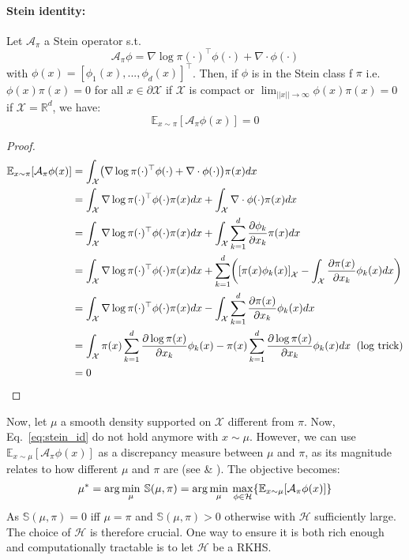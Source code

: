 \documentclass[runningheads,a4paper]{llncs}
\newcommand{\R}{\mathbb{R}}
\newcommand{\E}{\mathbb{E}}
\newcommand{\X}{\mathcal{X}}
\newcommand{\A}{\mathcal{A}}
\newcommand{\Hf}{\mathcal{H}}
\newcommand{\diff}[2]{\frac{\partial #1}{\partial #2}}
\DeclarePairedDelimiter{\pare}{(}{)}
\DeclarePairedDelimiter{\bra}{\{}{\}}
\DeclarePairedDelimiter{\sq}{[}{]}
\begin{document}
\paragraph{\bf Stein identity:}
Let $\A_\pi$ a Stein operator s.t.
$$
\A_\pi \phi = \nabla \log \pi(\cdot)^\top \phi(\cdot) + \nabla \cdot \phi(\cdot)
$$
with $\phi(x) = [\phi_1(x), ..., \phi_d(x)]^\top$.
Then, if $\phi$ is in the Stein class f $\pi$ i.e. $\phi(x)\pi(x) = 0$ for all $x \in \partial \X$
if $\X$ is compact or $\lim_{||x|| \to \infty} \phi(x) \pi(x) = 0$ if $\X = \R^d$, we have:
\begin{equation}
  \E_{x \sim \pi}[\A_\pi \phi (x)] = 0
  \label{eq:stein_id}
\end{equation}
\begin{proof}
  \begin{align*}
    \E_{x \sim \pi}[\A_\pi \phi (x)] &=
      \int_\X \pare*{ \nabla \log \pi(\cdot)^\top \phi(\cdot) + \nabla \cdot \phi(\cdot) } \pi(x) dx \\
    &= \int_\X \nabla \log \pi(\cdot)^\top \phi(\cdot) \pi(x) dx + \int_\X \nabla \cdot \phi(\cdot) \pi(x) dx \\
    &= \int_\X \nabla \log \pi(\cdot)^\top \phi(\cdot) \pi(x) dx +
      \int_\X \sum_{k=1}^d \diff{\phi_k}{x_k} \pi(x) dx \\
    &= \int_\X \nabla \log \pi(\cdot)^\top \phi(\cdot) \pi(x) dx +
    \sum_{k=1}^d \pare*{ \sq*{\pi(x) \phi_k(x)}_\X - \int_\X \diff{\pi(x)}{x_k} \phi_k(x) dx}\\
    &= \int_\X \nabla \log \pi(\cdot)^\top \phi(\cdot) \pi(x) dx -
      \int_\X \sum_{k=1}^d \diff{\pi(x)}{x_k} \phi_k(x) dx\\
    &= \int_\X  \pi(x) \sum_{k=1}^d \diff{\log \pi(x)}{x_k}\phi_k(x) -
    \pi(x) \sum_{k=1}^d \diff{\log \pi(x)}{x_k} \phi_k(x) dx \;\; \text{(log trick)}\\
    &= 0
  \end{align*}
\end{proof}

Now, let $\mu$ a smooth density supported on $\X$ different from $\pi$. Now, Eq.~\ref{eq:stein_id} do not hold
anymore with $x \sim \mu$. However, we can use $\E_{x \sim \mu}[\A_\pi \phi (x)]$ as a discrepancy
measure between $\mu$ and $\pi$, as its magnitude relates to how different $\mu$ and $\pi$ are
(see \cite{https://doi.org/10.48550/arxiv.1608.04471} \& \cite{https://doi.org/10.48550/arxiv.1704.07520}).
The objective becomes:
\begin{equation}
  \mu^* = \arg\min_{\mu} \: \mathbb{S}(\mu, \pi) =
    \arg\min_{\mu} \: \max_{\phi \in \Hf} \bra*{ \E_{x \sim \mu}[\A_\pi \phi (x)] }  
  \label{eq:stein_obj}
\end{equation}
As $\mathbb{S}(\mu, \pi) = 0$ iff $\mu = \pi$ and $\mathbb{S}(\mu, \pi) > 0$ otherwise with $\Hf$ sufficiently large.
The choice of $\Hf$ is therefore crucial. One way to ensure it is both rich enough and computationally tractable
is to let $\Hf$ be a RKHS.




\end{document}
